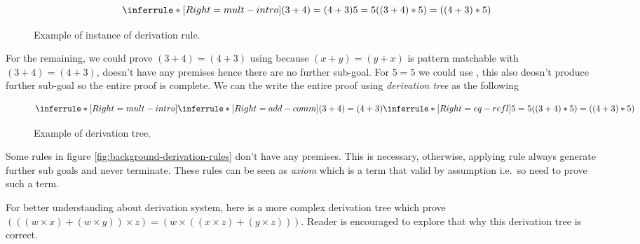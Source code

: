 \documentclass[master.tex]{subfiles}
\begin{document}
\begin{figure}[H]
\centering
$$ \derivTree{mult-intro}{((3 + 4) * 5) = ((4 + 3) * 5)}{(3 + 4) = (4 + 3) \\ 5 = 5} $$
\caption{Example of instance of derivation rule.}
\end{figure}

For the remaining, we could prove $(3 + 4) = (4 + 3)$ using
 because $(x + y) = (y + x)$ is pattern matchable with $(3
+ 4) = (4 + 3)$,  doesn't have any premises hence there are
no further sub-goal. For $5 = 5$ we could use , this also
deosn't produce further sub-goal so the entire proof is complete. We can the
write the entire proof using \emph{derivation tree} as the following

\begin{figure}[H]
\centering
$$ \derivTree{mult-intro}{((3 + 4) * 5) = ((4 + 3) * 5)}
     {\derivTree{add-comm}{(3 + 4) = (4 + 3)}{ } \\ \\ \\
      \derivTree{eq-refl}{5 = 5}{ }} $$
\caption{Example of derivation tree.}
\label{fig:background-derivation-tree-1}
\end{figure}

Some rules in figure \ref{fig:background-derivation-rules} don't have any
premises. This is necessary, otherwise, applying rule always generate further
sub goals and never terminate. These rules can be seen as \emph{axiom} which is
a term that valid by assumption i.e.\ so need to prove such a term.

For better understanding about derivation system, here is a more complex
derivation tree which prove $(((w \times x) + (w \times y)) \times z) = (w \times ((x \times z) + (y
\times z)))$. Reader is encouraged to explore that why this derivation tree is
correct.
\end{document}
